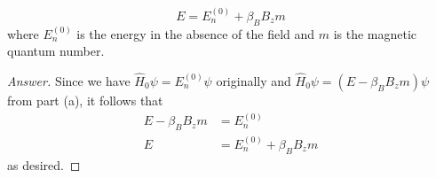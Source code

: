 \documentclass[../psets.tex]{subfiles}
\begin{document}
\begin{enumerate}
\begin{enumerate}
        \begin{equation*}
            E = E_n^{(0)}+\beta_BB_zm
        \end{equation*}
        where $E_n^{(0)}$ is the energy in the absence of the field and $m$ is the magnetic quantum number.
        \begin{proof}[Answer]
            Since we have $\hat{H}_0\psi=E_n^{(0)}\psi$ originally and $\hat{H}_0\psi=(E-\beta_BB_zm)\psi$ from part (a), it follows that
            \begin{align*}
                E-\beta_BB_zm &= E_n^{(0)}\\
                E &= E_n^{(0)}+\beta_BB_zm
            \end{align*}
            as desired.
        \end{proof}
    \end{enumerate}
\end{enumerate}
\end{document}
